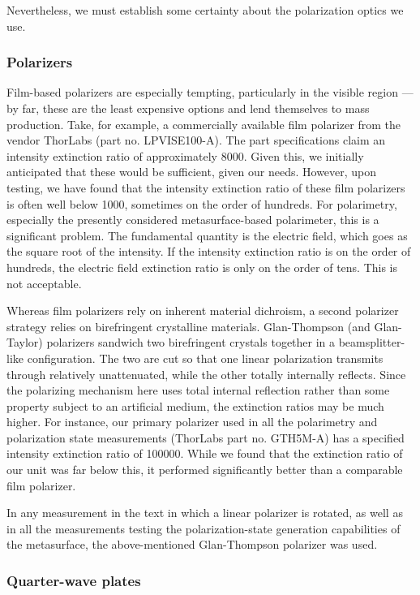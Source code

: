 \documentclass[footinbib,aps,prl,superscriptaddress]{revtex4-1}
\begin{document}
Nevertheless, we must establish some certainty about the polarization optics we use.

\subsubsection{Polarizers}

Film-based polarizers are especially tempting, particularly in the visible region --- by far, these are the least expensive options and lend themselves to mass production. Take, for example, a commercially available film polarizer from the vendor ThorLabs (part no. LPVISE100-A). The part specifications claim an intensity extinction ratio of approximately 8000. Given this, we initially anticipated that these would be sufficient, given our needs. However, upon testing, we have found that the intensity extinction ratio of these film polarizers is often well below 1000, sometimes on the order of hundreds. For polarimetry, especially the presently considered metasurface-based polarimeter, this is a significant problem. The fundamental quantity is the electric field, which goes as the square root of the intensity. If the intensity extinction ratio is on the order of hundreds, the electric field extinction ratio is only on the order of tens. This is not acceptable.

Whereas film polarizers rely on inherent material dichroism, a second polarizer strategy relies on birefringent crystalline materials. Glan-Thompson (and Glan-Taylor) polarizers sandwich two birefringent crystals together in a beamsplitter-like configuration. The two are cut so that one linear polarization transmits through relatively unattenuated, while the other totally internally reflects. Since the polarizing mechanism here uses total internal reflection rather than some property subject to an artificial medium, the extinction ratios may be much higher. For instance, our primary polarizer used in all the polarimetry and polarization state measurements (ThorLabs part no. GTH5M-A) has a specified intensity extinction ratio of 100000. While we found that the extinction ratio of our unit was far below this, it performed significantly better than a comparable film polarizer.

In any measurement in the text in which a linear polarizer is rotated, as well as in all the measurements testing the polarization-state generation capabilities of the metasurface, the above-mentioned Glan-Thompson polarizer was used.

\subsubsection{Quarter-wave plates}
\end{document}
